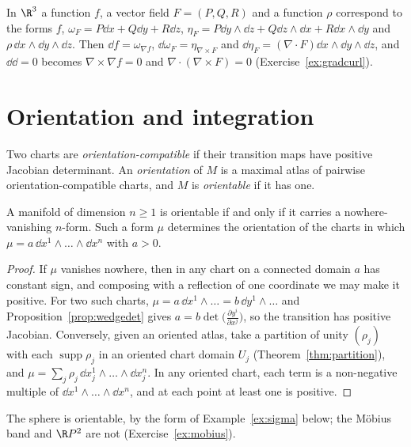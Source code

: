 \begin{example}\label{ex:gradcurldiv}
In $\R^3$ a function $f$, a vector field $F=(P,Q,R)$ and a function $\rho$ correspond to the forms $f$, $\omega_F=P\dd x+Q\dd y+R\dd z$,
$\eta_F=P\dd y\wedge\dd z+Q\dd z\wedge\dd x+R\dd x\wedge\dd y$ and $\rho\,\dd x\wedge\dd y\wedge\dd z$. Then $\dd f=\omega_{\nabla f}$, $\dd\omega_F=\eta_{\nabla\times F}$ and
$\dd\eta_F=(\nabla\cdot F)\dd x\wedge\dd y\wedge\dd z$, and $\dd\dd=0$ becomes $\nabla\times\nabla f=0$ and $\nabla\cdot(\nabla\times F)=0$ (Exercise~\ref{ex:gradcurl}).
\end{example}

\section{Orientation and integration}

\begin{definition}
Two charts are \emph{orientation-compatible} if their transition maps have positive Jacobian determinant. An \emph{orientation} of $M$ is a maximal atlas of
pairwise orientation-compatible charts, and $M$ is \emph{orientable} if it has one.
\end{definition}

\begin{proposition}\label{prop:volumeform}
A manifold of dimension $n\ge1$ is orientable if and only if it carries a nowhere-vanishing $n$-form. Such a form $\mu$ determines the orientation of the
charts in which $\mu=a\,\dd x^1\wedge\dots\wedge\dd x^n$ with $a>0$.
\end{proposition}
\begin{proof}
If $\mu$ vanishes nowhere, then in any chart on a connected domain $a$ has constant sign, and composing with a reflection of one coordinate we may make
it positive. For two such charts, $\mu=a\,\dd x^1\wedge\dots=b\,\dd y^1\wedge\dots$ and Proposition~\ref{prop:wedgedet} gives $a=b\det\bigl(\frac{\partial y^i}{\partial x^j}\bigr)$, so the
transition has positive Jacobian. Conversely, given an oriented atlas, take a partition of unity $(\rho_j)$ with each $\operatorname{supp}\rho_j$ in an oriented chart
domain $U_j$ (Theorem~\ref{thm:partition}), and $\mu=\sum_j\rho_j\,\dd x_j^1\wedge\dots\wedge\dd x_j^n$. In any oriented chart, each term is a non-negative multiple of
$\dd x^1\wedge\dots\wedge\dd x^n$, and at each point at least one is positive.
\end{proof}

The sphere is orientable, by the form of Example~\ref{ex:sigma} below; the M\"obius band and $\R P^2$ are not (Exercise~\ref{ex:mobius}).

